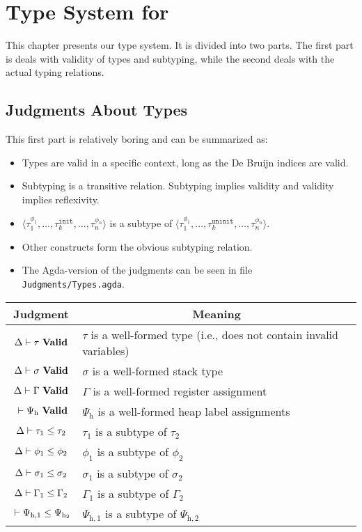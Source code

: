 \chapter{Type System for \ATAL}
\label{chap:types}

This chapter presents our type system. It is divided into two parts. The first
part is deals with validity of types and subtyping, while the second deals with
the actual typing relations.

\section{Judgments About Types}

This first part is relatively boring and can be summarized as:

\begin{itemize}
\item Types are valid in a specific context, long as the De Bruijn indices are
  valid.
\item Subtyping is a transitive relation. Subtyping implies validity and validity implies reflexivity.
\item
  $\langle \tau_1^{\phi_1}, \dots, \tau_k^{\mathtt{init}}, \dots,
  \tau_n^{\phi_n} \rangle$ is a subtype of
  $\langle \tau_1^{\phi_1}, \dots, \tau_k^{\mathtt{uninit}}, \dots,
  \tau_n^{\phi_n} \rangle$.
\item Other constructs form the obvious subtyping relation.
\item The Agda-version of the judgments can be seen in file
  \texttt{Judgments/Types.agda}.
\end{itemize}

\begin{tabular}{|c|p{7.5 cm}|}
  \hline
  Judgment & \multicolumn{1}{|c|}{Meaning} \\
  \hline

  ${\Delta} |- {\tau}\ \mathbf{Valid}$ & $\tau$ is a well-formed type (i.e., does not contain invalid variables) \\
  ${\Delta} |- {\sigma}\ \mathbf{Valid}$ & $\sigma$ is a well-formed stack type \\
  ${\Delta} |- {\Gamma}\ \mathbf{Valid}$ & $\Gamma$ is a well-formed register assignment \\
  ${} |- {\Psi_{\mathrm{h}}}\ \mathbf{Valid}$ & $\Psi_{\mathrm{h}}$ is a well-formed heap label assignments \\
  \hline

  ${\Delta} |- {\tau_1} \le {\tau_2}$ & $\tau_1$ is a subtype of $\tau_2$ \\
  ${\Delta} |- {\phi_1} \le {\phi_2}$ & $\phi_1$ is a subtype of $\phi_2$ \\
  ${\Delta} |- {\sigma_1} \le {\sigma_2}$ & $\sigma_1$ is a subtype of $\sigma_2$ \\
  ${\Delta} |- {\Gamma_1} \le {\Gamma_2}$ & $\Gamma_1$ is a subtype of $\Gamma_2$ \\
  ${} |- {\Psi_{\mathrm{h},1}} \le {\Psi_{\mathrm{h}_2}}$ & $\Psi_{\mathrm{h},1}$ is a subtype of $\Psi_{\mathrm{h},2}$ \\
  \hline
\end{tabular}

